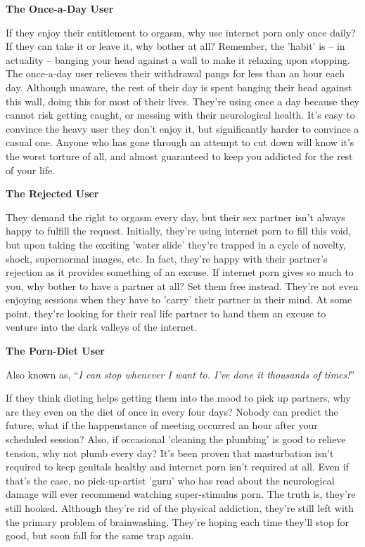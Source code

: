 \documentclass[
]{book}
\begin{document}
\textbf{The Once-a-Day User}

If they enjoy their entitlement to orgasm, why use internet porn only once daily? If they can take it or leave it, why bother at all? Remember, the 'habit' is -- in actuality -- banging your head against a wall to make it relaxing upon stopping. The once-a-day user relieves their withdrawal pangs for less than an hour each day. Although unaware, the rest of their day is spent banging their head against this wall, doing this for most of their lives. They're using once a day because they cannot risk getting caught, or messing with their neurological health. It's easy to convince the heavy user they don't enjoy it, but significantly harder to convince a casual one. Anyone who has gone through an attempt to cut down will know it's the worst torture of all, and almost guaranteed to keep you addicted for the rest of your life.

\textbf{The Rejected User}

They demand the right to orgasm every day, but their sex partner isn't always happy to fulfill the request. Initially, they're using internet porn to fill this void, but upon taking the exciting 'water slide' they're trapped in a cycle of novelty, shock, supernormal images, etc. In fact, they're happy with their partner's rejection as it provides something of an excuse. If internet porn gives so much to you, why bother to have a partner at all? Set them free instead. They're not even enjoying sessions when they have to 'carry' their partner in their mind. At some point, they're looking for their real life partner to hand them an excuse to venture into the dark valleys of the internet.

\textbf{The Porn-Diet User}

Also known as, ``\emph{I can stop whenever I want to. I've done it thousands of times!}''

If they think dieting helps getting them into the mood to pick up partners, why are they even on the diet of once in every four days? Nobody can predict the future, what if the happenstance of meeting occurred an hour after your scheduled session? Also, if occasional 'cleaning the plumbing' is good to relieve tension, why not plumb every day? It's been proven that masturbation isn't required to keep genitals healthy and internet porn isn't required at all. Even if that's the case, no pick-up-artist 'guru' who has read about the neurological damage will ever recommend watching super-stimulus porn. The truth is, they're still hooked. Although they're rid of the physical addiction, they're still left with the primary problem of brainwashing. They're hoping each time they'll stop for good, but soon fall for the same trap again.
\end{document}
